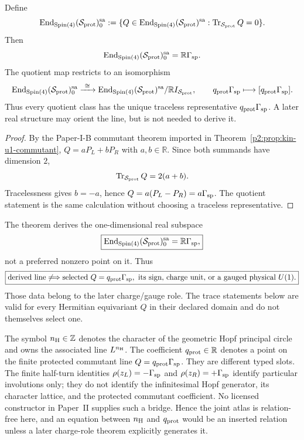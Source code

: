 \documentclass[12pt,a4paper]{article}
\begin{document}
\begin{theorem}
\label{p2:thm:kin-u1-unique}
Define
\[
\operatorname{End}_{\mathrm{Spin}(4)}(\mathcal S_{\rm prot})^{\mathrm{sa}}_0
:=
\{Q\in\operatorname{End}_{\mathrm{Spin}(4)}(\mathcal S_{\rm prot})^{\mathrm{sa}}:
       \operatorname{Tr}_{\mathcal S_{\rm prot}}Q=0\}.
\]
Then
\[
\operatorname{End}_{\mathrm{Spin}(4)}(\mathcal S_{\rm prot})^{\mathrm{sa}}_0
=\mathbb R\Gamma_{\rm sp}.
\]
The quotient map restricts to an isomorphism
\[
\operatorname{End}_{\mathrm{Spin}(4)}(\mathcal S_{\rm prot})^{\mathrm{sa}}_0
\xrightarrow{\ \cong\ }
\operatorname{End}_{\mathrm{Spin}(4)}(\mathcal S_{\rm prot})^{\mathrm{sa}}/
\mathbb RI_{\mathcal S_{\rm prot}},
\qquad
q_{\rm prot}\Gamma_{\rm sp}
\longmapsto[q_{\rm prot}\Gamma_{\rm sp}].
\]
Thus every quotient class has the unique traceless representative
\(q_{\rm prot}\Gamma_{\rm sp}\).  A later real structure may orient the line, but
is not needed to derive it.
\end{theorem}

\begin{proof}
By the Paper-I-B commutant theorem imported in
Theorem~\ref{p2:prop:kin-u1-commutant},
\(Q=aP_L+bP_R\) with \(a,b\in\mathbb R\).  Since both summands have
dimension \(2\),
\[
        \operatorname{Tr}_{\mathcal S_{\rm prot}}Q=2(a+b).
\]
Tracelessness gives \(b=-a\), hence
\(Q=a(P_L-P_R)=a\Gamma_{\rm sp}\).  The quotient statement is the
same calculation without choosing a traceless representative.
\end{proof}

\begin{remark}
The theorem derives the one-dimensional real subspace
\[
 \boxed{\operatorname{End}_{\mathrm{Spin}(4)}(\mathcal S_{\rm prot})^{\rm sa}_0
 =\mathbb R\Gamma_{\rm sp},}
\]
not a preferred nonzero point on it.  Thus
\[
 \boxed{\text{derived line}\not\Longrightarrow
 \text{selected }Q=q_{\rm prot}\Gamma_{\rm sp},
 \text{ its sign, charge unit, or a gauged physical }U(1).}
\]
Those data belong to the later charge/gauge role.  The trace statements below
are valid for every Hermitian equivariant \(Q\) in their declared domain and
do not themselves select one.
\end{remark}

\begin{remark}
\label{p2e:rem:hopf-protected-charge-firewall}
The symbol \(n_{\rm H}\in\mathbb Z\) denotes the character of the geometric
Hopf principal circle and owns the associated line \(L^{n_{\rm H}}\).  The
coefficient \(q_{\rm prot}\in\mathbb R\) denotes a point on the finite
protected commutant line
\(Q=q_{\rm prot}\Gamma_{\rm sp}\).  They are different typed slots.
The finite half-turn identities
\(\rho(z_L)=-\Gamma_{\rm sp}\) and
\(\rho(z_R)=+\Gamma_{\rm sp}\) identify particular involutions only; they do
not identify the infinitesimal Hopf generator, its character lattice, and the
protected commutant coefficient.  No licensed constructor in Paper~II supplies
such a bridge.  Hence the joint atlas is relation-free here, and an equation
between \(n_{\rm H}\) and \(q_{\rm prot}\) would be an inserted relation unless
a later charge-role theorem explicitly generates it.
\end{remark}
\end{document}
